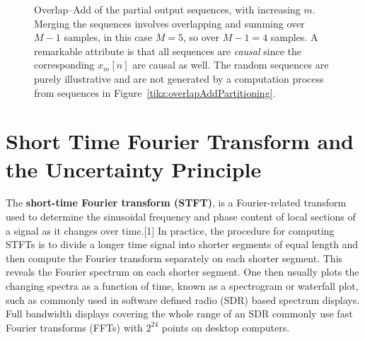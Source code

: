 \documentclass[\documentfontsize, twocolumn]{\classname}
\begin{document}
\begin{figure*}
\begin{center}
\end{center}\caption{Overlap--Add of the partial output sequences, with increasing $m$. Merging the sequences involves overlapping and summing over $M - 1$ samples, in this case $M=5$, so over $M - 1 = 4$ samples. A remarkable attribute is that all sequences are \emph{causal} since the corresponding $x_m[n]$ are causal as well. The random sequences are purely illustrative and are not generated by a computation process from sequences in Figure~\ref{tikz:overlapAddPartitioning}.}\label{tikz:overlapAddMerging}
\end{figure*}

\clearpage


\section{Short Time Fourier Transform and the Uncertainty Principle}

The \textbf{short-time Fourier transform (STFT)}, is a Fourier-related
transform used to determine the sinusoidal frequency and phase content of local
sections of a signal as it changes over time.[1] In practice, the procedure for
computing STFTs is to divide a longer time signal into shorter segments of
equal length and then compute the Fourier transform separately on each shorter
segment. This reveals the Fourier spectrum on each shorter segment. One then
usually plots the changing spectra as a function of time, known as a
spectrogram or waterfall plot, such as commonly used in software defined radio
(SDR) based spectrum displays. Full bandwidth displays covering the whole range
of an SDR commonly use fast Fourier transforms (FFTs) with $2^{24}$ points on
desktop computers\cite{bib:shortTimeFourierTransform}.
\end{document}
